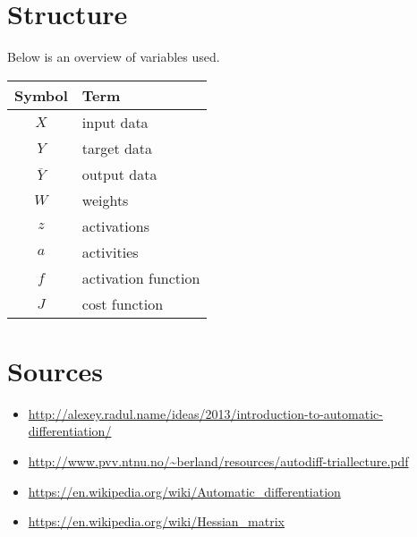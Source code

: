 \documentclass[11pt]{article}
\begin{document}
\newpage
\section{Structure}
Below is an overview of variables used.
\begin{center} 
\begin{tabular}{c | l }
Symbol 			& Term 					\\
\hline
$X$ 			& input data 			\\
$Y$ 			& target data 			\\
$\overline Y$ 	& output data 			\\
$W$ 			& weights				\\
$z$ 			& activations 			\\
$a$ 			& activities 			\\
$f$ 			& activation function 	\\
$J$ 			& cost function 			\\

\end{tabular}
\end{center}



\section{Sources}
\begin{itemize}
	\item \url{http://alexey.radul.name/ideas/2013/introduction-to-automatic-differentiation/}
	\item \url{http://www.pvv.ntnu.no/~berland/resources/autodiff-triallecture.pdf}
	\item \url{https://en.wikipedia.org/wiki/Automatic_differentiation}
	\item \url{https://en.wikipedia.org/wiki/Hessian_matrix}
\end{itemize}
\end{document}
